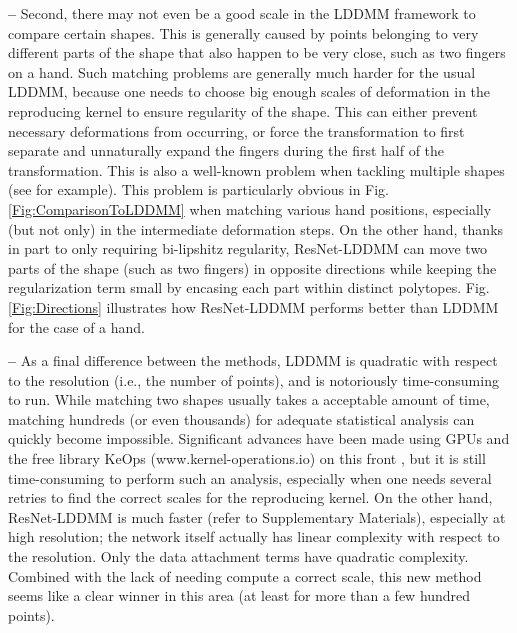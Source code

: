 \textbf{--} Second, there may not even be a good scale in the LDDMM framework to compare certain shapes. This is generally caused by points belonging to very different parts of the shape that also happen to be very close, such as two fingers on a hand. Such matching problems are generally much harder for the usual LDDMM, because one needs to choose big enough scales of deformation in the reproducing kernel to ensure regularity of the shape. This can either prevent necessary deformations from occurring, or force the transformation to first separate and unnaturally expand the fingers during the first half of the transformation. This is also a well-known problem when tackling multiple shapes (see \cite{arguillere2016multipleshapes} for example). This problem is particularly obvious in Fig. \ref{Fig:ComparisonToLDDMM} when matching various hand positions, especially (but not only) in the intermediate deformation steps. On the other hand, thanks in part to only requiring bi-lipshitz regularity, ResNet-LDDMM can move two parts of the shape (such as two fingers) in opposite directions while keeping the regularization term small by encasing each part within distinct polytopes. Fig. \ref{Fig:Directions} illustrates how ResNet-LDDMM performs better than LDDMM for the case of a hand.%

\textbf{--} As a final difference between the methods, LDDMM is quadratic with respect to the resolution (i.e., the number of points), and is notoriously time-consuming to run. While matching two shapes usually takes a  acceptable amount of time, matching hundreds (or even thousands) for adequate statistical analysis can quickly become impossible. Significant advances have been made using GPUs and the free library KeOps (www.kernel-operations.io) on this front \cite{charlier2020kernel}, but it is still time-consuming to perform such an analysis, especially when one needs several retries to find the correct scales for the reproducing kernel. On the other hand, ResNet-LDDMM is much faster (refer to Supplementary Materials), especially at high resolution; the network itself actually has linear complexity with respect to the resolution. Only the data attachment terms have quadratic complexity. Combined with the lack of needing compute a correct scale, this new method seems like a clear winner in this area (at least for more than a few hundred points).%

